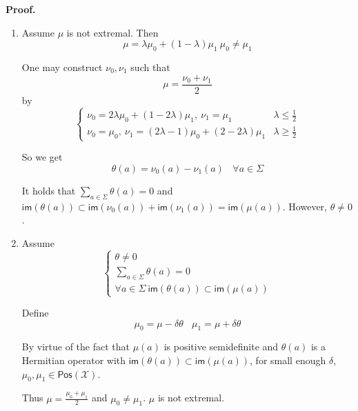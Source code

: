 \documentclass[aps,pra,onecolumn,notitlepage,superscriptaddress]{revtex4-1}
\newcommand{\spc}[1]{\mathcal{#1}}
\newcommand{\Pos}{\mathsf{Pos}}
\newcommand{\im}{\mathsf{im}}
\def\Proof{{\bf Proof.~}}
\begin{document}
    \Proof {
        \begin{enumerate}
            \item Assume $\mu$ is not extremal. Then
            \begin{equation}
                \mu = \lambda \mu_0 + (1-\lambda) \mu_1 \ \mu_0 \neq \mu_1
            \end{equation}

            One may construct $\nu_0, \nu_1$ such that
            \begin{equation}
                \mu = \frac{\nu_0 + \nu_1}{2}
            \end{equation}
            by
            \begin{equation}
                \begin{cases}
                    \nu_0 = 2\lambda \mu_0 + (1-2\lambda)\mu_1, \ \nu_1 = \mu_1 & \lambda \leq \frac{1}{2} \\
                    \nu_0 = \mu_0, \ \nu_1 = (2\lambda - 1)\mu_0 + (2-2\lambda)\mu_1 & \lambda \geq \frac{1}{2}
                \end{cases}
            \end{equation}

            So we get
            \begin{equation}
                \theta(a) = \nu_0(a) - \nu_1(a) \ \ \ \ \forall a \in \Sigma
            \end{equation}

            It holds that $\sum_{a \in \Sigma} \theta(a) = 0$ and $\im(\theta(a)) \subset \im(\nu_0(a)) + \im(\nu_1(a)) = \im(\mu(a))$. However, $\theta \neq 0$.

            \item Assume
            \begin{equation}
                \begin{cases}
                    \theta \neq 0 \\
                    \sum_{a \in \Sigma} \theta(a) = 0 \\
                    \forall a \in \Sigma \ \im(\theta(a)) \subset  \im(\mu(a))
                \end{cases}
            \end{equation}

            Define
            \begin{equation}
                \mu_0 = \mu - \delta \theta \ \ \ \ \mu_1 = \mu + \delta \theta
            \end{equation}
            
            By virtue of the fact that $\mu(a)$ is positive semidefinite and $\theta(a)$ is a Hermitian operator with $\im(\theta(a)) \subset \im(\mu(a))$, for small enough $\delta$, $\mu_0, \mu_1 \in \Pos(\spc X)$.

            Thus $\mu = \frac{\mu_0 + \mu_1}{2}$ and $\mu_0 \neq \mu_1$. $\mu$ is not extremal.
        \end{enumerate}
    }
\end{document}
